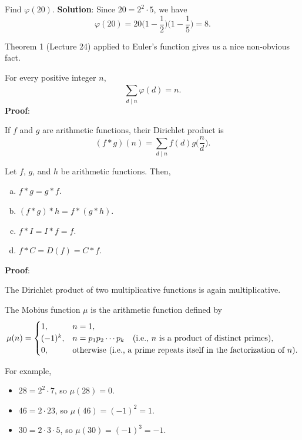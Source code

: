 \begin{Example}{}{}
    Find $ \varphi(20) $.
    \tcblower{}
    \textbf{Solution}: Since $ 20=2^2\cdot 5 $, we have
    \[ \varphi(20)=20\biggl(1-\frac{1}{2}\biggr)\biggl(1-\frac{1}{5}\biggr)=8. \]
\end{Example}
Theorem 1 (Lecture 24) applied to Euler's function gives us a nice non-obvious fact.
\begin{Proposition}{}{}
    For every positive integer $ n $,
    \[ \sum_{d\mid n}^{}\varphi(d)=n. \]
    \tcblower{}
    \textbf{Proof}:
\end{Proposition}
\begin{Definition}{}{}
    If $ f $ and $ g $ are arithmetic functions, their Dirichlet product is
    \[ (f*g)(n)=\sum_{d\mid n}^{}f(d)g\biggl(\frac{n}{d}\biggr). \]
\end{Definition}
\begin{Proposition}{}{}
    Let $ f $, $ g $, and $ h $ be arithmetic functions. Then,
    \begin{enumerate}[(a)]
        \item $ f*g=g*f $.
        \item $ (f*g)*h=f*(g*h) $.
        \item $ f*I=I*f=f $.
        \item $ f*C=D(f)=C*f $.
    \end{enumerate}
    \tcblower{}
    \textbf{Proof}:
\end{Proposition}
\begin{Proposition}{}{}
    The Dirichlet product of two multiplicative functions is again multiplicative.
\end{Proposition}
\begin{Definition}{}{}
    The Mobius function $ \mu $ is the arithmetic function defined by
    \[ \mu(n)=\begin{cases}
            1,      & n=1,                                                                          \\
            (-1)^k, & n=p_1p_2\cdots p_k\quad \text{(i.e., $ n $ is a product of distinct primes)}, \\
            0,      & \text{otherwise (i.e., a prime repeats itself in the factorization of $n$)}.
        \end{cases} \]
\end{Definition}
For example,
\begin{itemize}
    \item $ 28=2^2\cdot 7 $, so $ \mu(28)=0 $.
    \item $ 46=2\cdot 23 $, so $ \mu(46)=(-1)^2=1 $.
    \item $ 30=2\cdot 3\cdot 5 $, so $ \mu(30)=(-1)^3=-1 $.
\end{itemize}
